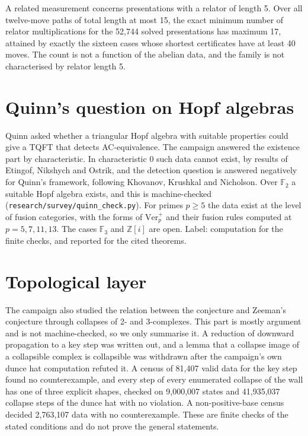 \documentclass[11pt,a4paper]{article}
\theoremstyle{definition}
\begin{document}
A related measurement concerns presentations with a relator of length 5. Over all twelve-move paths of total length at most 15, the exact minimum number of relator multiplications for the 52,744 solved presentations has maximum 17, attained by exactly the sixteen cases whose shortest certificates have at least 40 moves. The count is not a function of the abelian data, and the family is not characterised by relator length 5.

\section{Quinn's question on Hopf algebras}\label{sec:quinn}

Quinn asked whether a triangular Hopf algebra with suitable properties could give a TQFT that detects AC-equivalence. The campaign answered the existence part by characteristic. In characteristic 0 such data cannot exist, by results of Etingof, Nikshych and Ostrik, and the detection question is answered negatively for Quinn's framework, following Khovanov, Krushkal and Nicholson. Over $\mathbb{F}_2$ a suitable Hopf algebra exists, and this is machine-checked (\texttt{research/survey/quinn\_check.py}). For primes $p\ge5$ the data exist at the level of fusion categories, with the forms of $\mathrm{Ver}_p^+$ and their fusion rules computed at $p=5,7,11,13$. The cases $\mathbb{F}_3$ and $\mathbb{Z}[i]$ are open. Label: computation for the finite checks, and reported for the cited theorems.

\section{Topological layer}\label{sec:topology}

The campaign also studied the relation between the conjecture and Zeeman's conjecture \cite{Zee63} through collapses of 2- and 3-complexes. This part is mostly argument and is not machine-checked, so we only summarise it. A reduction of downward propagation to a key step was written out, and a lemma that a collapse image of a collapsible complex is collapsible was withdrawn after the campaign's own dunce hat computation refuted it. A census of 81,407 valid data for the key step found no counterexample, and every step of every enumerated collapse of the wall has one of three explicit shapes, checked on 9,000,007 states and 41,935,037 collapse steps of the dunce hat with no violation. A non-positive-base census decided 2,763,107 data with no counterexample. These are finite checks of the stated conditions and do not prove the general statements.
\end{document}
